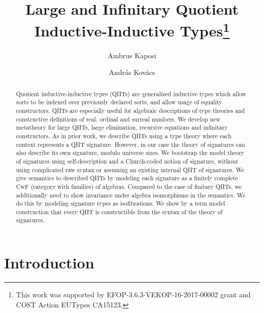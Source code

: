 \documentclass{llncs}
\newcommand{\Piinf}{\mathsf{\tilde{\Pi}}}
\begin{document}
\title{Large and Infinitary Quotient Inductive-Inductive Types\thanks{This work
    was supported by EFOP-3.6.3-VEKOP-16-2017-00002 grant and COST
    Action EUTypes CA15123.}}

\author{Ambrus Kaposi \and Andr{\'a}s Kov{\'a}cs}

\maketitle

\begin{abstract}
Quotient inductive-inductive types (QIITs) are generalized inductive types which
allow sorts to be indexed over previously declared sorts, and allow usage of
equality constructors. QIITs are especially useful for algebraic descriptions of
type theories and constructive definitions of real, ordinal and surreal
numbers. We develop new metatheory for large QIITs, large elimination, recursive
equations and infinitary constructors. As in prior work, we describe QIITs using
a type theory where each context represents a QIIT signature. However, in our
case the theory of signatures can also describe its own signature, modulo
universe sizes. We bootstrap the model theory of signatures using
self-description and a Church-coded notion of signature, without using
complicated raw syntax or assuming an existing internal QIIT of signatures. We
give semantics to described QIITs by modeling each signature as a finitely
complete CwF (category with families) of algebras. Compared to the case of
finitary QIITs, we additionally need to show invariance under algebra
isomorphisms in the semantics. We do this by modeling signature types as
isofibrations. We show by a term model construction that every QIIT is
constructible from the syntax of the theory of signatures.
\end{abstract}

\section{Introduction}
\label{sec:intro}

\end{document}
